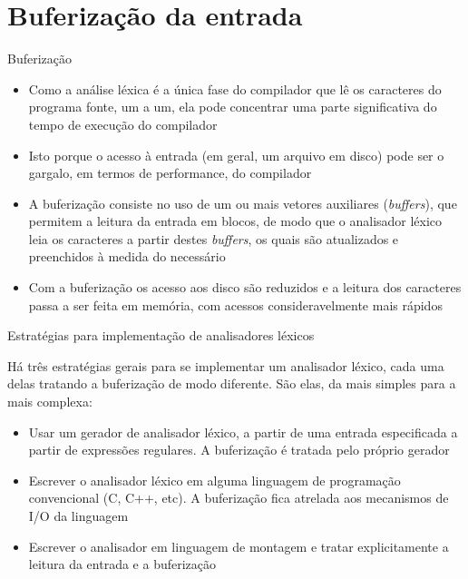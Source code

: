 \section{Buferização da entrada}

\begin{frame}[fragile]{Buferização}

    \begin{itemize}
        \item Como a análise léxica é a única fase do compilador que lê os caracteres do programa fonte, um a um, ela pode concentrar uma parte significativa
            do tempo de execução do compilador
        \pause

        \item Isto porque o acesso à entrada (em geral, um arquivo em disco) pode ser o gargalo, em termos de performance, do compilador
        \pause

        \item A buferização consiste no uso de um ou mais vetores auxiliares (\textit{buffers}), que permitem a leitura da entrada em blocos, de modo que o analisador léxico
            leia os caracteres a partir destes \textit{buffers}, os quais são atualizados e preenchidos à medida do necessário
        \pause

        \item Com a buferização os acesso aos disco são reduzidos e a leitura dos caracteres passa a ser feita em memória, com acessos consideravelmente mais
            rápidos
    \end{itemize}

\end{frame}
\begin{frame}[fragile]{Estratégias para implementação de analisadores léxicos}

    Há três estratégias gerais para se implementar um analisador léxico, cada uma delas tratando a buferização de modo diferente. São elas, da mais
    simples para a mais complexa:
    \pause
    \begin{itemize}
        \item Usar um gerador de analisador léxico, a partir de uma entrada especificada a partir de expressões regulares. A buferização é tratada pelo próprio
            gerador
        \pause

        \item Escrever o analisador léxico em alguma linguagem de programação convencional (C, C++, etc). A buferização fica atrelada aos mecanismos de I/O da linguagem
        \pause

        \item Escrever o analisador em linguagem de montagem e tratar explicitamente a leitura da entrada e a buferização
    \end{itemize}

\end{frame}

